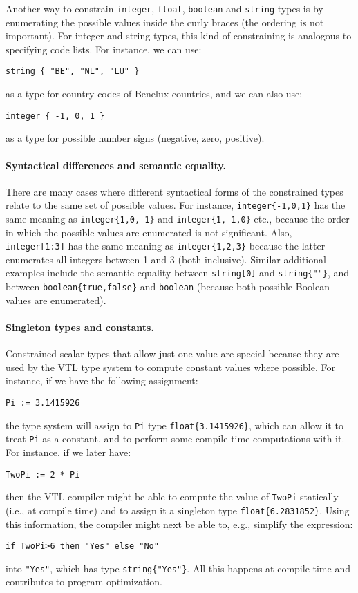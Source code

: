 \documentclass[droidmono,libertine,twoside,user,unofficial]{ecarticle}
\begin{document}
Another way to constrain \texttt{integer}, \texttt{float},
\texttt{boolean} and \texttt{string} types is by enumerating the
possible values inside the curly braces (the ordering is not
important).  For integer and string types, this kind of constraining
is analogous to specifying code lists.  For instance, we can use:
\begin{lstlisting}
string { "BE", "NL", "LU" }
\end{lstlisting}
as a type for country codes of Benelux countries, and we can also use:
\begin{lstlisting}
integer { -1, 0, 1 }
\end{lstlisting}
as a type for possible number signs (negative, zero, positive).

\paragraph{Syntactical differences and semantic equality.}

There are many cases where different syntactical forms of the
constrained types relate to the same set of possible values.  For
instance, \texttt{integer\{-1,0,1\}} has the same meaning as
\texttt{integer\{1,0,-1\}} and \texttt{integer\{1,-1,0\}} etc.,
because the order in which the possible values are enumerated is not
significant.  Also, \texttt{integer[1:3]} has the same meaning as
\texttt{integer\{1,2,3\}} because the latter enumerates all integers
between 1 and 3 (both inclusive).  Similar additional examples include the
semantic equality between \texttt{string[0]} and
\texttt{string\{""\}}, and between \texttt{boolean\{true,false\}} and
\texttt{boolean} (because both possible Boolean values are enumerated).

\paragraph{Singleton types and constants.}

Constrained scalar types that allow just one value are special because
they are used by the VTL type system to compute constant values where
possible.  For instance, if we have the following assignment:
\begin{lstlisting}
Pi := 3.1415926
\end{lstlisting}
the type system will assign to \texttt{Pi} type
\texttt{float\{3.1415926\}}, which can allow it to treat \texttt{Pi}
as a  constant, and to perform some compile-time computations with
it.  For instance, if we later have:
\begin{lstlisting}
TwoPi := 2 * Pi
\end{lstlisting}
then the VTL compiler might be able to compute the value of
\texttt{TwoPi} statically (i.e., at compile time) and to assign it a
singleton type \texttt{float\{6.2831852\}}.  Using this information,
the compiler might next be able to, e.g., simplify the expression:
\begin{lstlisting}
if TwoPi>6 then "Yes" else "No"
\end{lstlisting}
into \texttt{"Yes"}, which has type \texttt{string\{"Yes"\}}.  All
this happens at compile-time and contributes to program optimization.
\end{document}
